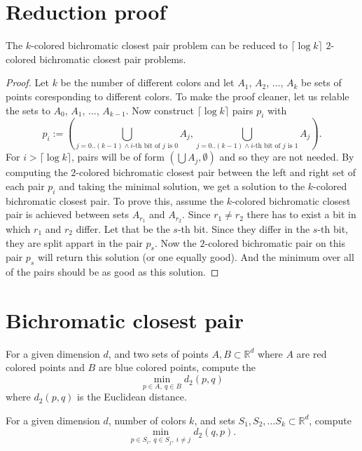 \documentclass[a4paper,UKenglish,cleveref, autoref, thm-restate]{lipics-v2021}
\begin{document}
\section{Reduction proof}
\begin{theorem}
The $k$-colored bichromatic closest pair problem can be reduced to $\lceil \log k \rceil$ $2$-colored bichromatic closest pair problems.
\end{theorem}
\begin{proof}
  Let $k$ be the number of different colors and let $A_1$, $A_2$, $\dots$, $A_k$ be sets of points coresponding to different colors.
  To make the proof cleaner, let us relable the sets to $A_0$, $A_1$, $\dots$, $A_{k-1}$.
  Now construct $\lceil \log k \rceil$ pairs $p_i$ with
  \[ p_i := \left(\bigcup \limits_{j = 0..(k-1) \wedge i\text{-th bit of }j \text{ is }0} A_j, \bigcup \limits_{j = 0..(k-1) \wedge i\text{-th bit of } j \text{ is }1} A_j\right). \]
  For $i > \lceil \log k \rceil$, pairs will be of form $( \bigcup A_j, \emptyset)$ and so they are not needed.
  By computing the $2$-colored bichromatic closest pair between the left and right set of each pair $p_i$ and taking the minimal solution, we get a solution to the $k$-colored bichromatic closest pair.
  To prove this, assume the $k$-colored bichromatic closest pair is achieved between sets $A_{r_1}$ and $A_{r_2}$.
  Since $r_1 \neq r_2$ there has to exist a bit in which $r_1$ and $r_2$ differ.
  Let that be the $s$-th bit.
  Since they differ in the $s$-th bit, they are split appart in the pair $p_s$.
  Now the $2$-colored bichromatic pair on this pair $p_s$ will return this solution (or one equally good).
  And the minimum over all of the pairs should be as good as this solution.
  
\end{proof}

\section{Bichromatic closest pair}

\begin{definition}
For a given dimension $d$, and two sets of points $A, B \subset \mathbb{R}^d$ where $A$ are red colored points and $B$ are blue colored points, compute the
$$ \min \limits_{p \in A,\ q\in B} d_2(p, q) $$
where $d_2(p, q)$ is the Euclidean distance.
\end{definition}

\begin{definition}
For a given dimension $d$, number of colors $k$, and sets $S_1, S_2, \dots S_k \subset \mathbb{R}^d$,
compute
$$ \min \limits_{p \in S_i,\ q \in S_j,\ i \neq j} d_2(q, p). $$

\end{definition}
\end{document}
